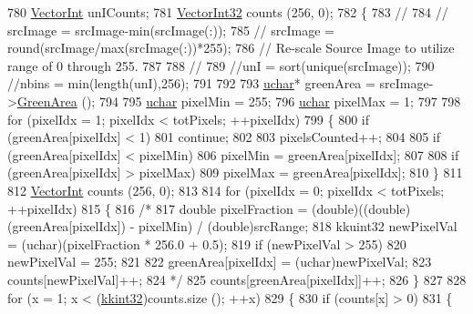 \begin{DoxyCode}
{{{{{{{{{{{{{{{{{{{{{{{{{{{{{{{{{{{{{{{{{{{{{{780   \hyperlink{namespace_k_k_b_a791ebe73f89917067a7aab9dbd817e45}{VectorInt}  unICounts;
781   \hyperlink{namespace_k_k_b_adf8a10085d231870d8a072046d6cba10}{VectorInt32}  counts (256, 0);
782   \{
783     \textcolor{comment}{// %
784     \textcolor{comment}{// srcImage = srcImage-min(srcImage(:));}
785     \textcolor{comment}{// srcImage = round(srcImage/max(srcImage(:))*255);}
786     \textcolor{comment}{//  Re-scale Source Image to utilize range of 0 through 255.}
787 
788     \textcolor{comment}{//%
789     \textcolor{comment}{//unI = sort(unique(srcImage));}
790     \textcolor{comment}{//nbins = min(length(unI),256);}
791  
792 
793     \hyperlink{namespace_k_k_b_ace9969169bf514f9ee6185186949cdf7}{uchar}*  greenArea = srcImage->\hyperlink{class_k_k_b_1_1_raster_af6ceacfa7835a295d239d141627dbec7}{GreenArea} ();
794 
795     \hyperlink{namespace_k_k_b_ace9969169bf514f9ee6185186949cdf7}{uchar}  pixelMin = 255;
796     \hyperlink{namespace_k_k_b_ace9969169bf514f9ee6185186949cdf7}{uchar}  pixelMax = 1;
797 
798     \textcolor{keywordflow}{for}  (pixelIdx = 1;  pixelIdx < totPixels;  ++pixelIdx)
799     \{
800       \textcolor{keywordflow}{if}  (greenArea[pixelIdx] < 1)
801         \textcolor{keywordflow}{continue};
802 
803       pixelsCounted++;
804 
805       \textcolor{keywordflow}{if}  (greenArea[pixelIdx] < pixelMin)
806         pixelMin = greenArea[pixelIdx];
807 
808       \textcolor{keywordflow}{if}  (greenArea[pixelIdx] > pixelMax)
809         pixelMax = greenArea[pixelIdx];
810     \}
811 
812     \hyperlink{namespace_k_k_b_a791ebe73f89917067a7aab9dbd817e45}{VectorInt}  counts (256, 0);
813 
814     \textcolor{keywordflow}{for}  (pixelIdx = 0;  pixelIdx < totPixels;  ++pixelIdx)
815     \{
816       \textcolor{comment}{/*}
817 \textcolor{comment}{      double  pixelFraction = (double)((double)(greenArea[pixelIdx]) - pixelMin) / (double)srcRange;}
818 \textcolor{comment}{      kkuint32  newPixelVal = (uchar)(pixelFraction * 256.0 + 0.5);}
819 \textcolor{comment}{      if  (newPixelVal > 255)}
820 \textcolor{comment}{        newPixelVal = 255;}
821 \textcolor{comment}{}
822 \textcolor{comment}{      greenArea[pixelIdx] = (uchar)newPixelVal;}
823 \textcolor{comment}{      counts[newPixelVal]++;}
824 \textcolor{comment}{      */}
825       counts[greenArea[pixelIdx]]++;
826     \}
827 
828     \textcolor{keywordflow}{for}  (x = 1;  x < (\hyperlink{namespace_k_k_b_a8fa4952cc84fda1de4bec1fbdd8d5b1b}{kkint32})counts.size ();  ++x)
829     \{
830       \textcolor{keywordflow}{if}  (counts[x] > 0)
831       \{
}}}}}}}}}}}}}}}}}}}}}}}}}}}}}}}}}}}}}}}}}}}}}}}}
\end{DoxyCode}
